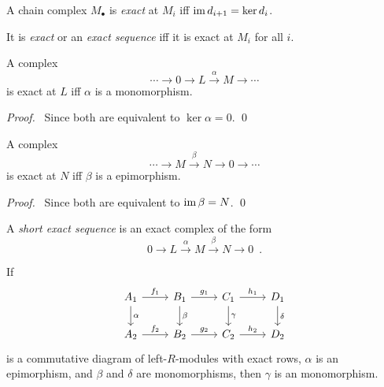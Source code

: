 \begin{df}[Exact]
A chain complex $M_\bullet$ is \emph{exact} at $M_i$ iff $\operatorname{im} d_{i+1} = \ker d_i$.

It is \emph{exact} or an \emph{exact sequence} iff it is exact at $M_i$ for all $i$.
\end{df}

\begin{prop}
A complex
\[ \cdots \rightarrow 0 \rightarrow L \stackrel{\alpha}{\rightarrow} M \rightarrow \cdots \]
is exact at $L$ iff $\alpha$ is a monomorphism.
\end{prop}

\begin{proof}
\pf\ Since both are equivalent to $\ker \alpha = 0$. \qed
\end{proof}

\begin{prop}
A complex
\[ \cdots \rightarrow M \stackrel{\beta}{\rightarrow} N \rightarrow 0 \rightarrow \cdots \]
is exact at $N$ iff $\beta$ is a epimorphism.
\end{prop}

\begin{proof}
\pf\ Since both are equivalent to $\operatorname{im} \beta = N$. \qed
\end{proof}

\begin{df}
A \emph{short exact sequence} is an exact complex of the form
\[ 0 \rightarrow L \stackrel{\alpha}{\rightarrow} M \stackrel{\beta}{\rightarrow} N \rightarrow 0 \enspace . \]
\end{df}

\begin{prop}
If
\[ \begin{tikzcd}
A_1 \arrow[r,"f_1"] \arrow[d,"\alpha"] & B_1 \arrow[r,"g_1"] \arrow[d,"\beta"] & C_1 \arrow[r,"h_1"] \arrow[d,"\gamma"] & D_1 \arrow[d,"\delta"] \\
A_2 \arrow[r,"f_2"] & B_2 \arrow[r,"g_2"] & C_2 \arrow[r,"h_2"] & D_2
\end{tikzcd} \]
is a commutative diagram of left-$R$-modules with exact rows, $\alpha$ is an epimorphism, and $\beta$ and $\delta$ are monomorphisms, then $\gamma$ is an monomorphism.
\end{prop}

